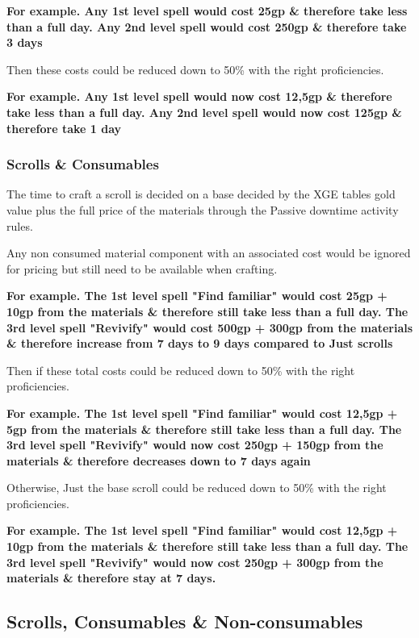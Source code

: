 \documentclass{article}
\begin{document}
    \textbf{For example. Any 1st level spell would cost 25gp \& therefore take less than a full day. Any 2nd level spell would cost 250gp \& therefore take 3 days}
    
    Then these costs could be reduced down to 50\% with the right proficiencies.
    
    \textbf{For example. Any 1st level spell would now cost 12,5gp \& therefore take less than a full day. Any 2nd level spell would now cost 125gp \& therefore take 1 day}


    \subsubsection*{Scrolls \& Consumables}

    The time to craft a scroll is decided on a base decided by the XGE tables gold value plus the full price of the materials through the Passive downtime activity rules. 

    Any non consumed material component with an associated cost would be ignored for pricing but still need to be available when crafting.

    \textbf{For example. The 1st level spell "Find familiar" would cost 25gp + 10gp from the materials \& therefore still take less than a full day. The 3rd level spell "Revivify" would cost 500gp + 300gp from the materials \& therefore increase from 7 days to 9 days compared to Just scrolls}
    
    Then if these total costs could be reduced down to 50\% with the right proficiencies.
    
    \textbf{For example. The 1st level spell "Find familiar" would cost 12,5gp + 5gp from the materials \& therefore still take less than a full day. The 3rd level spell "Revivify" would now cost 250gp + 150gp from the materials \& therefore decreases down to 7 days again}
    
    Otherwise, Just the base scroll could be reduced down to 50\% with the right proficiencies.

    \textbf{For example. The 1st level spell "Find familiar" would cost 12,5gp + 10gp from the materials \& therefore still take less than a full day. The 3rd level spell "Revivify" would now cost 250gp + 300gp from the materials \& therefore stay at 7 days.}


    \subsection*{Scrolls, Consumables \& Non-consumables}
\end{document}
